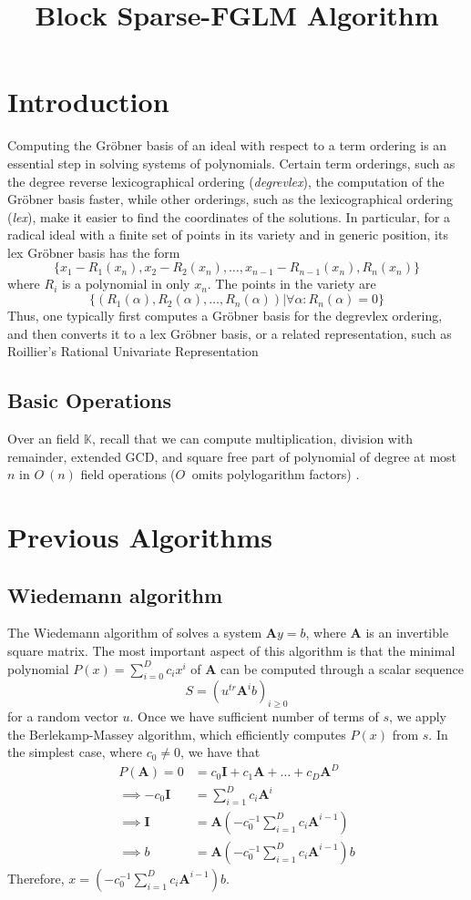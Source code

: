 \documentclass[12pt]{article}
\title{Block Sparse-FGLM Algorithm}
\def\mA{\mathbf{A}}
\def\mI{\mathbf{I}}
\begin{document}
\tableofcontents
\pagebreak

\section{Introduction}
Computing the Gr\"obner basis of an ideal with respect to a term
ordering is an essential step in solving systems of polynomials. 
Certain term orderings, such as the degree reverse lexicographical 
ordering (\textit{degrevlex}), the computation of the Gr\"obner basis
faster, while other orderings, such as the lexicographical ordering
(\textit{lex}), make it easier to find the coordinates of the solutions.
In particular, for a radical ideal with a finite set of points in its variety
and in generic position, its lex Gr\"obner basis has the form
$$ \{  x_1 - R_1(x_n), x_2-R_2(x_n),\dots, x_{n-1}-R_{n-1}(x_n), R_n(x_n)  \}$$
where $R_i$ is a polynomial in only $x_n$. The points in the variety are
$$\{ ( R_1(\alpha), R_2(\alpha), \dots, R_n(\alpha)  ) |\forall \alpha: R_n(\alpha)=0  \}$$
Thus, one typically first computes a Gr\"obner basis for the degrevlex ordering,
and then converts it to a lex Gr\"obner basis, or a related representation, such as 
Roillier's Rational Univariate Representation \cite{Rouillier99}

\subsection{Basic Operations}
Over an field $\mathbb{K}$,
recall that we can compute multiplication,
division with remainder, extended GCD, and square free part
of polynomial of degree at most $n$ in $O^{\tilde{~}}(n)$
field operations ($O^{\tilde{~}}$ omits polylogarithm factors)
\cite{GaGe13}. 


\newpage
\section{Previous Algorithms}

\subsection{Wiedemann algorithm}
The Wiedemann algorithm of \cite{Wiedemann86} solves a system
$\mA y = b$, where $\mA$ is an invertible square matrix. The most
important aspect of this algorithm is that the minimal polynomial
$P(x) = \sum_{i = 0}^{D} c_i x^i$ of $\mA$ can be computed
through a scalar sequence
$$ S = (u^{tr}\mA^ib)_{i \ge 0}$$
for a random vector $u$. Once we have sufficient number of terms
of $s$, we apply the Berlekamp-Massey algorithm, which efficiently
computes $P(x)$ from $s$.
In the simplest case, where $c_0 \neq 0$, we have that
\begin{align*}
P(\mA) = 0 &= c_0 \mI + c_1\mA + \dots + c_D \mA^D \\
\implies -c_0 \mI &= \sum_{i=1}^{D}c_i\mA^i \\
\implies \mI &= \mA(-c_0^{-1} \sum_{i=1}^{D}c_i\mA^{i-1})\\
\implies b &= \mA(-c_0^{-1} \sum_{i=1}^{D}c_i\mA^{i-1})b
\end{align*}
Therefore, $x = (-c_0^{-1} \sum_{i=1}^{D}c_i\mA^{i-1})b$.
\end{document}
